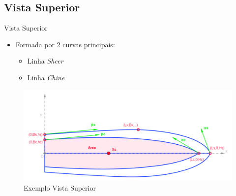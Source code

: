 \documentclass{beamer}
\begin{document}
\subsection{Vista Superior}
\begin{frame}{Vista Superior}
\begin{itemize}
	\item Formada por 2 curvas principais:
	\begin{itemize}
		\item Linha \textit{Sheer}
		\item Linha \textit{Chine}
	\end{itemize}
\end{itemize}
\begin{figure}[h]
	\centering
	\includegraphics[scale=0.3]{vistasuperior}
	\caption{Exemplo Vista Superior}
	\label{fig:central}
\end{figure}
\end{frame}
\end{document}
